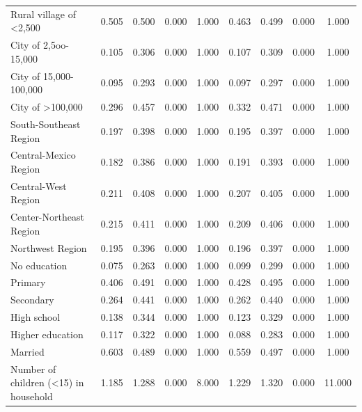 \documentclass[12pt,english,british]{article}
\begin{document}
\begin{table}[h!]
\begin{center}
\begin{adjustbox}{max width=\textwidth}
{\begin{tabular}{l*{2}{cccc}}
Rural village of <2,500&       0.505&       0.500&       0.000&       1.000&       0.463&       0.499&       0.000&       1.000\\
City of 2,5oo-15,000&       0.105&       0.306&       0.000&       1.000&       0.107&       0.309&       0.000&       1.000\\
City of 15,000-100,000&       0.095&       0.293&       0.000&       1.000&       0.097&       0.297&       0.000&       1.000\\
City of >100,000    &       0.296&       0.457&       0.000&       1.000&       0.332&       0.471&       0.000&       1.000\\
South-Southeast Region&       0.197&       0.398&       0.000&       1.000&       0.195&       0.397&       0.000&       1.000\\
Central-Mexico Region&       0.182&       0.386&       0.000&       1.000&       0.191&       0.393&       0.000&       1.000\\
Central-West Region &       0.211&       0.408&       0.000&       1.000&       0.207&       0.405&       0.000&       1.000\\
Center-Northeast Region&       0.215&       0.411&       0.000&       1.000&       0.209&       0.406&       0.000&       1.000\\
Northwest Region    &       0.195&       0.396&       0.000&       1.000&       0.196&       0.397&       0.000&       1.000\\
No education        &       0.075&       0.263&       0.000&       1.000&       0.099&       0.299&       0.000&       1.000\\
Primary             &       0.406&       0.491&       0.000&       1.000&       0.428&       0.495&       0.000&       1.000\\
Secondary           &       0.264&       0.441&       0.000&       1.000&       0.262&       0.440&       0.000&       1.000\\
High school         &       0.138&       0.344&       0.000&       1.000&       0.123&       0.329&       0.000&       1.000\\
Higher education    &       0.117&       0.322&       0.000&       1.000&       0.088&       0.283&       0.000&       1.000\\
Married             &       0.603&       0.489&       0.000&       1.000&       0.559&       0.497&       0.000&       1.000\\
Number of children (<15) in household&       1.185&       1.288&       0.000&       8.000&       1.229&       1.320&       0.000&      11.000\\

\end{tabular}}
\end{adjustbox}
\end{center}
\end{table}
\end{document}
